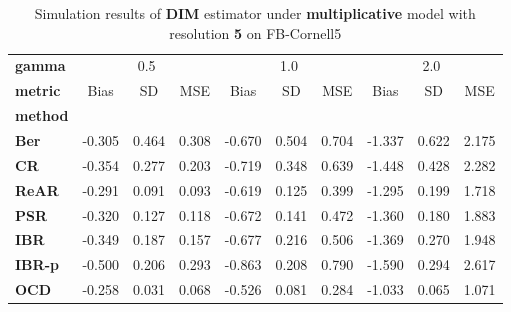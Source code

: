 \begin{table}
\centering
\caption{Simulation results of \textbf{DIM} estimator under \textbf{multiplicative} model with resolution \textbf{5} on FB-Cornell5}
\begin{tabular}{lccccccccc}
\toprule
\textbf{gamma} & \multicolumn{3}{c}{0.5} & \multicolumn{3}{c}{1.0} & \multicolumn{3}{c}{2.0} \\
\textbf{metric} &   Bias &     SD &    MSE &   Bias &     SD &    MSE &   Bias &     SD &    MSE \\
\textbf{method} &        &        &        &        &        &        &        &        &        \\
\midrule
\textbf{Ber} & -0.305 &  0.464 &  0.308 & -0.670 &  0.504 &  0.704 & -1.337 &  0.622 &  2.175 \\
\textbf{CR} & -0.354 &  0.277 &  0.203 & -0.719 &  0.348 &  0.639 & -1.448 &  0.428 &  2.282 \\
\textbf{ReAR} & -0.291 &  0.091 &  0.093 & -0.619 &  0.125 &  0.399 & -1.295 &  0.199 &  1.718 \\
\textbf{PSR} & -0.320 &  0.127 &  0.118 & -0.672 &  0.141 &  0.472 & -1.360 &  0.180 &  1.883 \\
\textbf{IBR} & -0.349 &  0.187 &  0.157 & -0.677 &  0.216 &  0.506 & -1.369 &  0.270 &  1.948 \\
\textbf{IBR-p} & -0.500 &  0.206 &  0.293 & -0.863 &  0.208 &  0.790 & -1.590 &  0.294 &  2.617 \\
\textbf{OCD} & -0.258 &  0.031 &  0.068 & -0.526 &  0.081 &  0.284 & -1.033 &  0.065 &  1.071 \\
\bottomrule
\end{tabular}
\end{table}

